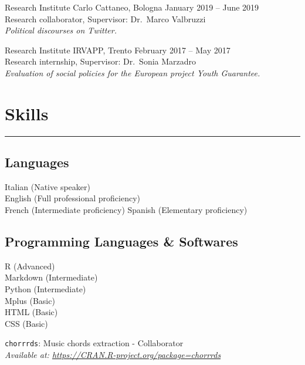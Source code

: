 \documentclass[12pt,]{article}
\begin{document}
Research Institute Carlo Cattaneo, Bologna
\hfill \begingroup\small January 2019 -- June 2019\endgroup\\
Research collaborator, Supervisor: Dr.~Marco Valbruzzi\\
\emph{Political discourses on Twitter.}

Research Institute IRVAPP, Trento \hfill \begingroup\small February 2017
-- May 2017\endgroup\\
Research internship, Supervisor: Dr.~Sonia Marzadro\\
\emph{Evaluation of social policies for the European project Youth
Guarantee.}

\hypertarget{skills}{%
\section{Skills}\label{skills}}

\vspace{-10pt}
\rule{1\linewidth}{\linethickness}

\hypertarget{languages}{%
\subsection{Languages}\label{languages}}

Italian (Native speaker)\\
English (Full professional proficiency)\\
French (Intermediate proficiency) Spanish (Elementary proficiency)\\
\newline

\hypertarget{programming-languages-softwares}{%
\subsection{Programming Languages \&
Softwares}\label{programming-languages-softwares}}

R (Advanced)\\
Markdown (Intermediate)\\
Python (Intermediate)\\
Mplus (Basic)\\
HTML (Basic)\\
CSS (Basic) \newline

\texttt{chorrrds}: Music chords extraction - Collaborator\\
\emph{Available at: \url{https://CRAN.R-project.org/package=chorrrds}}
\end{document}
